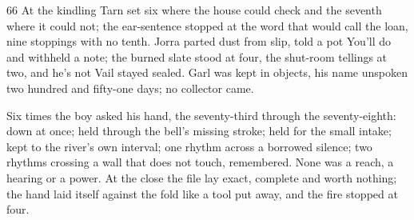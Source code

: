 \begin{CRchronicle}{66}
At the kindling Tarn set six where the house could check and the seventh where it could not; the ear-sentence stopped at the word that would call the loan, nine stoppings with no tenth. Jorra parted dust from slip, told a pot You’ll do and withheld a note; the burned slate stood at four, the shut-room tellings at two, and he’s not Vail stayed sealed. Garl was kept in objects, his name unspoken two hundred and fifty-one days; no collector came.

Six times the boy asked his hand, the seventy-third through the seventy-eighth: down at once; held through the bell’s missing stroke; held for the small intake; kept to the river’s own interval; one rhythm across a borrowed silence; two rhythms crossing a wall that does not touch, remembered. None was a reach, a hearing or a power. At the close the file lay exact, complete and worth nothing; the hand laid itself against the fold like a tool put away, and the fire stopped at four.
\end{CRchronicle}
